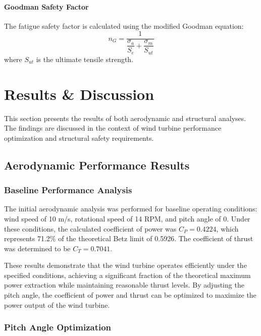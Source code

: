 \documentclass[11pt]{article}
\begin{document}
\paragraph{Goodman Safety Factor}

The fatigue safety factor is calculated using the modified Goodman equation:
\begin{equation}
 n_G = \frac{1}{\dfrac{\sigma_a}{S_e} + \dfrac{\sigma_m}{S_{ut}}}
\label{eq:goodman}
\end{equation}
where $S_{ut}$ is the ultimate tensile strength.

\section{Results \& Discussion}

This section presents the results of both aerodynamic and structural analyses. The findings are discussed in the context of wind turbine performance optimization and structural safety requirements.

\subsection{Aerodynamic Performance Results}

\subsubsection{Baseline Performance Analysis}

The initial aerodynamic analysis was performed for baseline operating conditions: wind speed of 10 m/s, rotational speed of 14 RPM, and pitch angle of 0\textdegree{}. Under these conditions, the calculated coefficient of power was $C_P = 0.4224$, which represents 71.2\% of the theoretical Betz limit of 0.5926. The coefficient of thrust was determined to be $C_T = 0.7041$.

These results demonstrate that the wind turbine operates efficiently under the specified conditions, achieving a significant fraction of the theoretical maximum power extraction while maintaining reasonable thrust levels. By adjusting the pitch angle, the coefficient of power and thrust can be optimized to maximize the power output of the wind turbine. 


\subsubsection{Pitch Angle Optimization}
\end{document}
